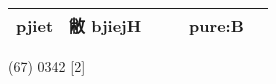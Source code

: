 \documentclass[14pt,a4paper]{scrartcl}
\begin{document}
\begin{longtable}[c]{@{}llllll@{}}
\begin{minipage}[t]{0.14\columnwidth}
pjiet
\strut\end{minipage} &
\begin{minipage}[t]{0.14\columnwidth}\raggedright\strut
敝 bjiejH
\strut\end{minipage} &
\begin{minipage}[t]{0.14\columnwidth}\raggedright\strut
\strut\end{minipage} &
\begin{minipage}[t]{0.14\columnwidth}\raggedright\strut
\strut\end{minipage} &
\begin{minipage}[t]{0.14\columnwidth}\raggedright\strut
pure:B
\strut\end{minipage}\tabularnewline
\bottomrule
\end{longtable}

(67) 0342 {[}2{]}
\end{document}
